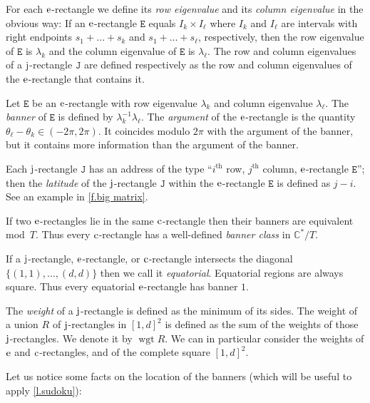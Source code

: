 \documentclass[10pt, a4paper]{amsart}
\theoremstyle{plain}
\theoremstyle{definition}
\theoremstyle{remark}
\theoremstyle{note}
\numberwithin{equation}{section}
\begin{document}
For each $\rm e$-rectangle we define its \emph{row eigenvalue} and its \emph{column eigenvalue}
in the obvious way: 
If an $\rm e$-rectangle ${\mathtt{E}}$ equals $I_k \times I_\ell$ where $I_k$ and $I_\ell$
are intervals with right endpoints $s_1 + \dots + s_k$ and $s_1 + \dots + s_\ell$, respectively,
then the row eigenvalue of ${\mathtt{E}}$ is $\lambda_k$ and the column eigenvalue of ${\mathtt{E}}$ is $\lambda_\ell$.
The row and column eigenvalues of a $\rm j$-rectangle ${\mathtt{J}}$ are defined respectively
as the row and column eigenvalues of the $\rm e$-rectangle that contains it.

Let ${\mathtt{E}}$ be an $\rm e$-rectangle with row eigenvalue $\lambda_k$ and column eigenvalue $\lambda_\ell$.
The \emph{banner} of ${\mathtt{E}}$ is defined by $\lambda_k^{-1}\lambda_\ell$. The \emph{argument} of the $\rm e$-rectangle is the quantity $\theta_\ell - \theta_k \in (-2\pi,2\pi)$. 
It coincides modulo $2\pi$ with the argument of the banner, but it contains more information than the argument of the banner. 

Each $\rm j$-rectangle ${\mathtt{J}}$ has an address of the type ``$i^\text{th}$ row, $j^\text{th}$ column, $\rm e$-rectangle ${\mathtt{E}}$''; then the \emph{latitude} of the $\rm j$-rectangle ${\mathtt{J}}$ within the $\rm e$-rectangle ${\mathtt{E}}$ is defined as $j-i$. See an example in \cref{f.big matrix}.

If two $\rm e$-rectangles lie in the same $\rm c$-rectangle then their banners are equivalent mod~$T$.
Thus every $\rm c$-rectangle has a well-defined \emph{banner class} in ${\mathbb{C}}^*/T$.

If a $\rm j$-rectangle, $\rm e$-rectangle, or $\rm c$-rectangle 
intersects the diagonal $\{(1,1), \dots, (d,d)\}$
then we call it \emph{equatorial}.
Equatorial regions are always square.
Thus every equatorial $\rm e$-rectangle has banner $1$.

The \emph{weight} of a $\rm j$-rectangle is defined as the minimum of its sides.
The weight of a union $R$ of $\rm j$-rectangles in $[1,d]^2$ is defined as
the sum of the weights of those $\rm j$-rectangles. We denote it by $\operatorname{wgt} R$.
We can in particular consider the weights of $\rm e$ and $\rm c$-rectangles, and of the complete square $[1,d]^2$.
\medskip

Let us notice some facts on the location of the banners
(which will be useful to apply \cref{l.sudoku}):
\end{document}
